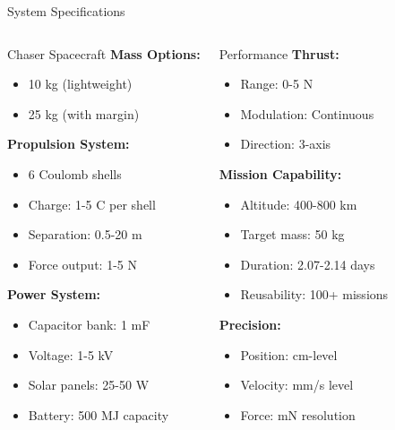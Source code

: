\documentclass[aspectratio=169]{beamer}
\begin{document}
\begin{frame}{System Specifications}
\begin{columns}[t]
\begin{block}{Chaser Spacecraft}
\textbf{Mass Options:}
\begin{itemize}
    \item 10 kg (lightweight)
    \item 25 kg (with margin)
\end{itemize}

\vspace{0.2cm}
\textbf{Propulsion System:}
\begin{itemize}
    \item 6 Coulomb shells
    \item Charge: 1-5 C per shell
    \item Separation: 0.5-20 m
    \item Force output: 1-5 N
\end{itemize}

\vspace{0.2cm}
\textbf{Power System:}
\begin{itemize}
    \item Capacitor bank: 1 mF
    \item Voltage: 1-5 kV
    \item Solar panels: 25-50 W
    \item Battery: 500 MJ capacity
\end{itemize}
\end{block}

\begin{block}{Performance}
\textbf{Thrust:}
\begin{itemize}
    \item Range: 0-5 N
    \item Modulation: Continuous
    \item Direction: 3-axis
\end{itemize}

\vspace{0.2cm}
\textbf{Mission Capability:}
\begin{itemize}
    \item Altitude: 400-800 km
    \item Target mass: 50 kg
    \item Duration: 2.07-2.14 days
    \item Reusability: 100+ missions
\end{itemize}

\vspace{0.2cm}
\textbf{Precision:}
\begin{itemize}
    \item Position: cm-level
    \item Velocity: mm/s level
    \item Force: mN resolution
\end{itemize}
\end{block}
\end{columns}
\end{frame}
\end{document}
